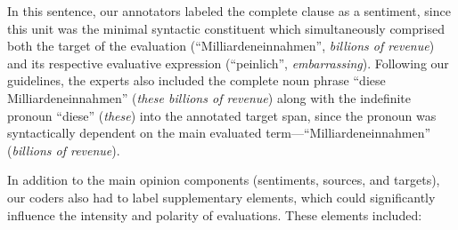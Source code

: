 In this sentence, our annotators labeled the complete clause as a
sentiment, since this unit was the minimal syntactic constituent which
simultaneously comprised both the target of the evaluation
(``Milliardeneinnahmen'', \emph{billions of revenue}) and its
respective evaluative expression (``peinlich'', \emph{embarrassing}).
Following our guidelines, the experts also included the complete noun
phrase ``diese Milliardeneinnahmen'' (\emph{these billions of
  revenue}) along with the indefinite pronoun ``diese'' (\emph{these})
into the annotated target span, since the pronoun was syntactically
dependent on the main evaluated term---``Milliardeneinnahmen''
(\emph{billions of revenue}).

In addition to the main opinion components (sentiments, sources, and
targets), our coders also had to label supplementary elements, which
could significantly influence the intensity and polarity of
evaluations.  These elements included:

